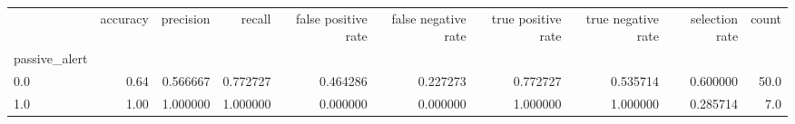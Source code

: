 \begin{tabular}{lrrrrrrrrr}
\toprule
{} &  accuracy &  precision &    recall &  false positive rate &  false negative rate &  true positive rate &  true negative rate &  selection rate &  count \\
passive\_alert &           &            &           &                      &                      &                     &                     &                 &        \\
\midrule
0.0           &      0.64 &   0.566667 &  0.772727 &             0.464286 &             0.227273 &            0.772727 &            0.535714 &        0.600000 &   50.0 \\
1.0           &      1.00 &   1.000000 &  1.000000 &             0.000000 &             0.000000 &            1.000000 &            1.000000 &        0.285714 &    7.0 \\
\bottomrule
\end{tabular}
